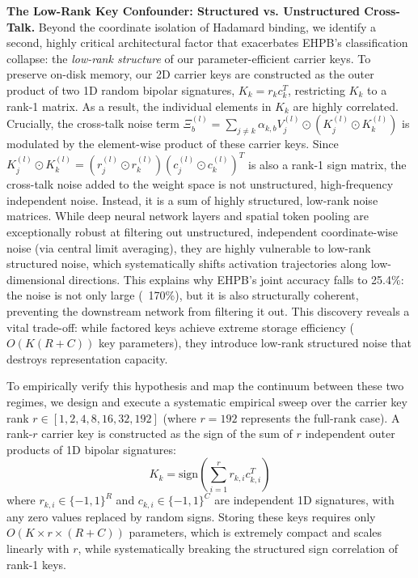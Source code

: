 \textbf{The Low-Rank Key Confounder: Structured vs. Unstructured Cross-Talk.} Beyond the coordinate isolation of Hadamard binding, we identify a second, highly critical architectural factor that exacerbates EHPB's classification collapse: the \textit{low-rank structure} of our parameter-efficient carrier keys. To preserve on-disk memory, our 2D carrier keys are constructed as the outer product of two 1D random bipolar signatures, $K_k = r_k c_k^T$, restricting $K_k$ to a rank-1 matrix. As a result, the individual elements in $K_k$ are highly correlated. Crucially, the cross-talk noise term $\Xi_b^{(l)} = \sum_{j \neq k} \alpha_{k,b} V_j^{(l)} \odot (K_j^{(l)} \odot K_k^{(l)})$ is modulated by the element-wise product of these carrier keys. Since $K_j^{(l)} \odot K_k^{(l)} = (r_j^{(l)} \odot r_k^{(l)}) (c_j^{(l)} \odot c_k^{(l)})^T$ is also a rank-1 sign matrix, the cross-talk noise added to the weight space is not unstructured, high-frequency independent noise. Instead, it is a sum of highly structured, low-rank noise matrices. While deep neural network layers and spatial token pooling are exceptionally robust at filtering out unstructured, independent coordinate-wise noise (via central limit averaging), they are highly vulnerable to low-rank structured noise, which systematically shifts activation trajectories along low-dimensional directions. This explains why EHPB's joint accuracy falls to 25.4\%: the noise is not only large (~170\%), but it is also structurally coherent, preventing the downstream network from filtering it out. This discovery reveals a vital trade-off: while factored keys achieve extreme storage efficiency ($O(K(R+C))$ key parameters), they introduce low-rank structured noise that destroys representation capacity. 

To empirically verify this hypothesis and map the continuum between these two regimes, we design and execute a systematic empirical sweep over the carrier key rank $r \in [1, 2, 4, 8, 16, 32, 192]$ (where $r=192$ represents the full-rank case). A rank-$r$ carrier key is constructed as the sign of the sum of $r$ independent outer products of 1D bipolar signatures:
\begin{equation}
K_k = \text{sign}\left(\sum_{i=1}^r r_{k, i} c_{k, i}^T\right)
\end{equation}
where $r_{k, i} \in \{-1, 1\}^R$ and $c_{k, i} \in \{-1, 1\}^C$ are independent 1D signatures, with any zero values replaced by random signs. Storing these keys requires only $O(K \times r \times (R+C))$ parameters, which is extremely compact and scales linearly with $r$, while systematically breaking the structured sign correlation of rank-1 keys.

